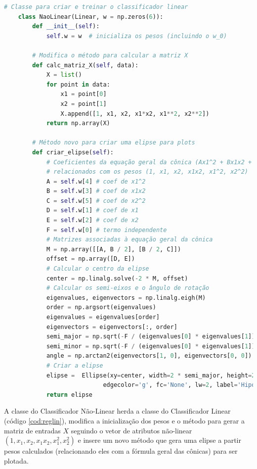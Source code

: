 \begin{lstlisting}[language=Python, caption=Classificador por Regressão Não-Linear, label=cod:reg_naolin]
    # Classe para criar e treinar o classificador linear
    class NaoLinear(Linear, w = np.zeros(6)):
        def __init__(self):
            self.w = w  # inicializa os pesos (incluindo o w_0)
        
        # Modifica o método para calcular a matriz X
        def calc_matriz_X(self, data):
            X = list()
            for point in data:
                x1 = point[0]
                x2 = point[1]
                X.append([1, x1, x2, x1*x2, x1**2, x2**2])
            return np.array(X)
        
        # Método novo para criar uma elipse para plots
        def criar_elipse(self):
            # Coeficientes da equação geral da cônica (Ax1^2 + Bx1x2 + Cx2^2 + Dx1 + Ex2 + F=0)
            # relacionados com os pesos (1, x1, x2, x1x2, x1^2, x2^2)
            A = self.w[4] # coef de x1^2
            B = self.w[3] # coef de x1x2
            C = self.w[5] # coef de x2^2
            D = self.w[1] # coef de x1
            E = self.w[2] # coef de x2
            F = self.w[0] # termo independente
            # Matrizes associadas à equação geral da cônica
            M = np.array([[A, B / 2], [B / 2, C]])
            offset = np.array([D, E])
            # Calcular o centro da elipse
            center = np.linalg.solve(-2 * M, offset)
            # Calcular os semi-eixos e o ângulo de rotação
            eigenvalues, eigenvectors = np.linalg.eigh(M)
            order = np.argsort(eigenvalues)
            eigenvalues = eigenvalues[order]
            eigenvectors = eigenvectors[:, order]
            semi_major = np.sqrt(-F / (eigenvalues[0] * eigenvalues[1])) / np.sqrt(eigenvalues[0])
            semi_minor = np.sqrt(-F / (eigenvalues[0] * eigenvalues[1])) / np.sqrt(eigenvalues[1])
            angle = np.arctan2(eigenvectors[1, 0], eigenvectors[0, 0])
            # Criar a elipse
            elipse =  Ellipse(xy=center, width=2 * semi_major, height=2 * semi_minor, angle=np.degrees(angle),
                            edgecolor='g', fc='None', lw=2, label='Hipótese (g)')
            return elipse
\end{lstlisting}

A classe do Classificador Não-Linear herda a classe do Classificador Linear (código \ref{cod:reglin}), modifica a inicialização dos pesos e o método para gerar a matriz de entradas $X$ seguindo o vetor de atributos não-linear $(1, x_1, x_2, x_1x_2, x_1^2, x_2^2)$ e insere um novo método que gera uma elipse a partir pesos calculados (relacionando eles com a fórmula geral das cônicas) para ser plotada.

